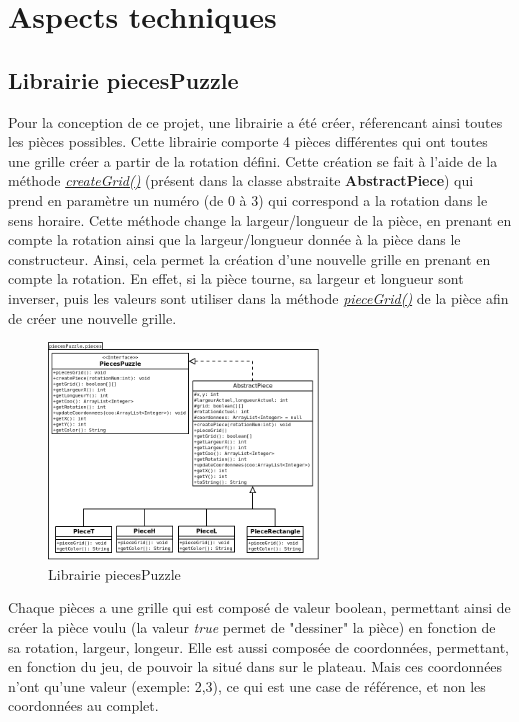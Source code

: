 \chapter{Aspects techniques}

	\section{Librairie piecesPuzzle}

        Pour la conception de ce projet, une librairie a été créer, réferencant ainsi toutes les pièces possibles. Cette librairie comporte 4 pièces différentes qui ont toutes une grille créer a partir de la rotation défini.
        Cette création se fait à l'aide de la méthode \underline{\textit{createGrid()}} (présent dans la classe abstraite \textbf{AbstractPiece}) qui prend en paramètre un numéro (de 0 à 3) qui correspond a la rotation dans le sens horaire. Cette méthode change la largeur/longueur de la pièce, en prenant en compte la rotation ainsi que la largeur/longueur donnée à la pièce dans le constructeur. Ainsi, cela permet la création d'une nouvelle grille en prenant en compte la rotation. En effet, si la pièce tourne, sa largeur et longueur sont inverser, puis les valeurs sont utiliser dans la méthode \underline{\textit{pieceGrid()}} de la pièce afin de créer une nouvelle grille.

        \begin{figure}[H]
			\centering\includegraphics[width=0.64\textwidth, keepaspectratio]{img/piecesPuzzle.png}
			\caption{Librairie piecesPuzzle}
			\label{fig:piecePuzzle}
		\end{figure}

        Chaque pièces a une grille qui est composé de valeur boolean, permettant ainsi de créer la pièce voulu (la valeur \textit{true}  permet de "dessiner" la pièce) en fonction de sa rotation, largeur, longeur. Elle est aussi composée de coordonnées, permettant, en fonction du jeu, de pouvoir la situé dans sur le plateau. Mais ces coordonnées n'ont qu'une valeur (exemple: 2,3), ce qui est une case de référence, et non les coordonnées au complet.


